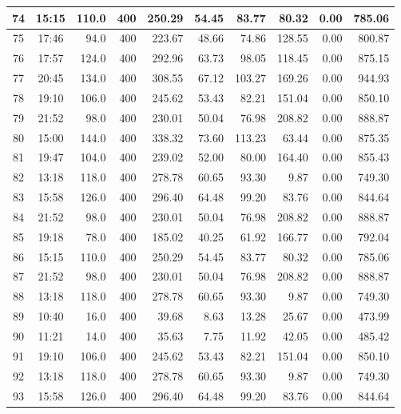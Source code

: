 \begin{landscape}
\begin{longtable}{|c|c|r|r|r|r|r|r|r|r|}
\hline
74 & 15:15 & 110.0 & 400 & 250.29 & 54.45 & 83.77 & 80.32 & 0.00 & 785.06 \\
\hline
\rowcolor{gray!8}
75 & 17:46 & 94.0 & 400 & 223.67 & 48.66 & 74.86 & 128.55 & 0.00 & 800.87 \\
\hline
76 & 17:57 & 124.0 & 400 & 292.96 & 63.73 & 98.05 & 118.45 & 0.00 & 875.15 \\
\hline
\rowcolor{gray!8}
77 & 20:45 & 134.0 & 400 & 308.55 & 67.12 & 103.27 & 169.26 & 0.00 & 944.93 \\
\hline
78 & 19:10 & 106.0 & 400 & 245.62 & 53.43 & 82.21 & 151.04 & 0.00 & 850.10 \\
\hline
\rowcolor{gray!8}
79 & 21:52 & 98.0 & 400 & 230.01 & 50.04 & 76.98 & 208.82 & 0.00 & 888.87 \\
\hline
80 & 15:00 & 144.0 & 400 & 338.32 & 73.60 & 113.23 & 63.44 & 0.00 & 875.35 \\
\hline
\rowcolor{gray!8}
81 & 19:47 & 104.0 & 400 & 239.02 & 52.00 & 80.00 & 164.40 & 0.00 & 855.43 \\
\hline
82 & 13:18 & 118.0 & 400 & 278.78 & 60.65 & 93.30 & 9.87 & 0.00 & 749.30 \\
\hline
\rowcolor{gray!8}
83 & 15:58 & 126.0 & 400 & 296.40 & 64.48 & 99.20 & 83.76 & 0.00 & 844.64 \\
\hline
84 & 21:52 & 98.0 & 400 & 230.01 & 50.04 & 76.98 & 208.82 & 0.00 & 888.87 \\
\hline
\rowcolor{gray!8}
85 & 19:18 & 78.0 & 400 & 185.02 & 40.25 & 61.92 & 166.77 & 0.00 & 792.04 \\
\hline
86 & 15:15 & 110.0 & 400 & 250.29 & 54.45 & 83.77 & 80.32 & 0.00 & 785.06 \\
\hline
\rowcolor{gray!8}
87 & 21:52 & 98.0 & 400 & 230.01 & 50.04 & 76.98 & 208.82 & 0.00 & 888.87 \\
\hline
88 & 13:18 & 118.0 & 400 & 278.78 & 60.65 & 93.30 & 9.87 & 0.00 & 749.30 \\
\hline
\rowcolor{gray!8}
89 & 10:40 & 16.0 & 400 & 39.68 & 8.63 & 13.28 & 25.67 & 0.00 & 473.99 \\
\hline
90 & 11:21 & 14.0 & 400 & 35.63 & 7.75 & 11.92 & 42.05 & 0.00 & 485.42 \\
\hline
\rowcolor{gray!8}
91 & 19:10 & 106.0 & 400 & 245.62 & 53.43 & 82.21 & 151.04 & 0.00 & 850.10 \\
\hline
92 & 13:18 & 118.0 & 400 & 278.78 & 60.65 & 93.30 & 9.87 & 0.00 & 749.30 \\
\hline
\rowcolor{gray!8}
93 & 15:58 & 126.0 & 400 & 296.40 & 64.48 & 99.20 & 83.76 & 0.00 & 844.64 \\

\end{longtable}
\end{landscape}
